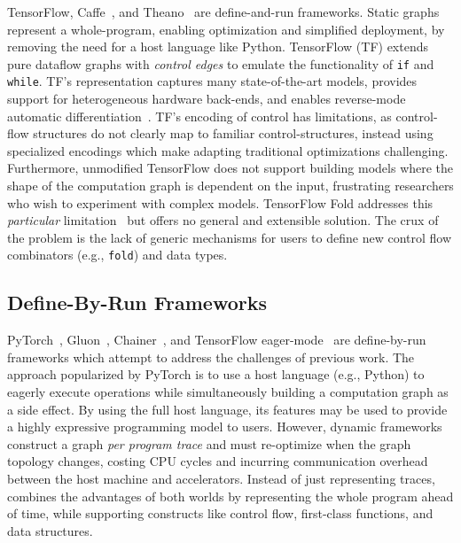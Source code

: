TensorFlow, Caffe~\citep{caffe}, and Theano~\citep{theano} are define-and-run frameworks.
Static graphs represent a whole-program,
  enabling optimization and simplified deployment,
  by removing the need for a host language like Python.
TensorFlow (TF) extends pure dataflow graphs with \textit{control edges}
      to emulate the functionality of \verb|if| and \verb|while|.
TF's representation captures many state-of-the-art models,
      provides support for heterogeneous hardware back-ends,
      and enables reverse-mode automatic differentiation~{\citep{ad_survey, tensorflow}}.
TF's encoding of control has limitations, as control-flow structures
    do not clearly map to familiar control-structures, instead using specialized
    encodings which make adapting traditional optimizations challenging.
Furthermore,
    unmodified TensorFlow does not support building models where the shape of
    the computation graph is dependent on the input,
    frustrating researchers who wish to experiment with complex models.
TensorFlow Fold addresses this \textit{particular} limitation~\citep{tensorflowfold}
    but offers no general and extensible solution.
The crux of the problem is the lack of generic mechanisms for users to
    define new control flow combinators (e.g., \verb|fold|) and data types.

\subsection*{Define-By-Run Frameworks}
PyTorch~\citep{pytorch_ad}, Gluon~\citep{gluon}, Chainer~\citep{chainer_learningsys2015},
    and TensorFlow eager-mode~\citep{tf_eager} are define-by-run frameworks which
    attempt to address the challenges of previous work.
The approach popularized by PyTorch is to use a host language (e.g., Python)
    to eagerly execute operations while simultaneously building a computation graph
    as a side effect.
By using the full host language,
  its features may be used to provide a highly expressive programming model to users.
However, dynamic frameworks construct a graph \textit{per program trace} and must re-optimize when
    the graph topology changes, costing CPU cycles and incurring communication overhead between the host
    machine and accelerators.
Instead of just representing traces, \relay combines the advantages of both worlds by
    representing the whole program ahead of time,
    while supporting constructs like control flow, first-class functions, and data structures.

